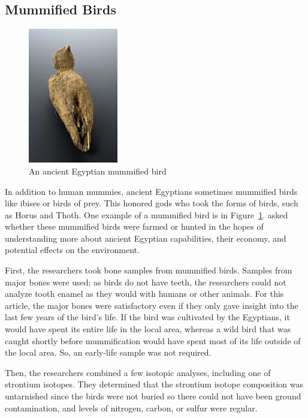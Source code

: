 \documentclass[a4paper, 12pt]{article}
\begin{document}
\subsection{Mummified Birds}
\begin{figure}[htbp]
    \centering
    \includegraphics[width=0.35\textwidth]{mummy_bird.jpg}
    \caption{An ancient Egyptian mummified bird \citep{wikipediaBird}}
    \label{fig:mummy_bird}
\end{figure}
In addition to human mummies, ancient Egyptians sometimes mummified birds
like ibises or birds of prey. This honored gods who took
the forms of birds, such as Horus and Thoth. One example of a mummified bird is in Figure~\ref{fig:mummy_bird}.
\cite{linglin2020} asked whether these mummified birds were farmed or hunted in the hopes of understanding
more about ancient Egyptian capabilities, their economy, and potential effects on
the environment.

First, the researchers took bone samples from mummified birds. Samples from major bones were used;
as birds do not have teeth, the researchers could not analyze tooth enamel as they would
with humans or other animals. For this article, the major bones were satisfactory even if they only gave
insight into the last few years of the bird's life. If the bird was cultivated by the
Egyptians, it would have spent its entire life in the local area, whereas a wild bird
that was caught shortly before mummification would have spent most of its life outside
of the local area. So, an early-life sample was not required.

Then, the researchers combined a few isotopic analyses, including one of strontium isotopes.
They determined that the strontium isotope composition was untarnished since the birds were not
buried so there could not have been ground contamination, and levels
of nitrogen, carbon, or sulfur were regular.
\end{document}
